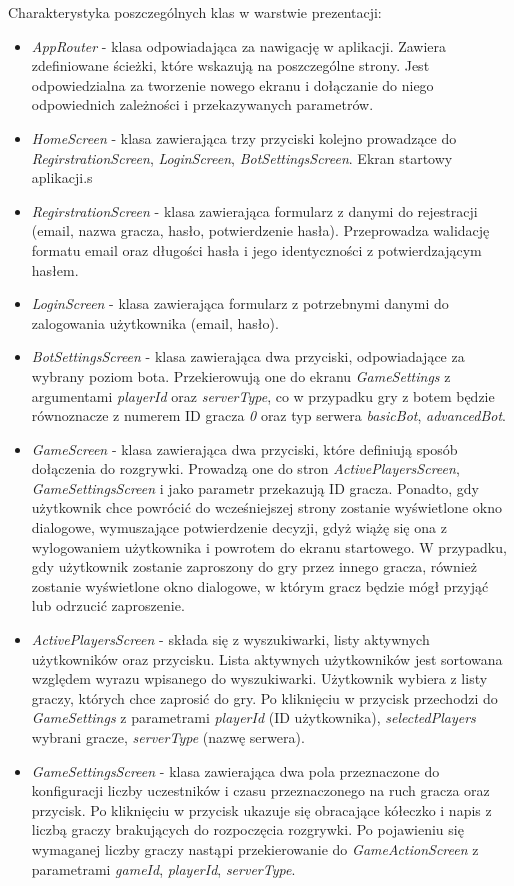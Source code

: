 Charakterystyka poszczególnych klas w warstwie prezentacji:
\begin{itemize}
	\item \emph{AppRouter} - klasa odpowiadająca za nawigację w aplikacji. Zawiera zdefiniowane ścieżki, które wskazują na poszczególne strony. Jest odpowiedzialna za tworzenie nowego ekranu i dołączanie do niego odpowiednich zależności i przekazywanych parametrów.
	\item \emph{HomeScreen} - klasa zawierająca trzy przyciski kolejno prowadzące do \emph{RegirstrationScreen}, \emph{LoginScreen}, \emph{BotSettingsScreen}. Ekran startowy aplikacji.s
	\item \emph{RegirstrationScreen} - klasa zawierająca formularz z danymi do rejestracji (email, nazwa gracza, hasło, potwierdzenie hasła). Przeprowadza walidację formatu email oraz długości hasła i jego identyczności z potwierdzającym hasłem.
	\item \emph{LoginScreen} - klasa zawierająca formularz z potrzebnymi danymi do zalogowania użytkownika (email, hasło).
	\item \emph{BotSettingsScreen} - klasa zawierająca dwa przyciski, odpowiadające za wybrany poziom bota. Przekierowują one do ekranu \emph{GameSettings} z argumentami \emph{playerId} oraz \emph{serverType}, co w przypadku gry z botem będzie równoznacze z numerem ID gracza \emph{0} oraz typ serwera \emph{basicBot}, \emph{advancedBot}.
	\item \emph{GameScreen} - klasa zawierająca dwa przyciski, które definiują sposób dołączenia do rozgrywki. Prowadzą one do stron \emph{ActivePlayersScreen}, \emph{GameSettingsScreen} i jako parametr przekazują ID gracza. Ponadto, gdy użytkownik chce powrócić do wcześniejszej strony zostanie wyświetlone okno dialogowe, wymuszające potwierdzenie decyzji, gdyż wiążę się ona z wylogowaniem użytkownika i powrotem do ekranu startowego. W przypadku, gdy użytkownik zostanie zaproszony do gry przez innego gracza, również zostanie wyświetlone okno dialogowe, w którym gracz będzie mógł przyjąć lub odrzucić zaproszenie.
	\item \emph{ActivePlayersScreen} - składa się z wyszukiwarki, listy aktywnych użytkowników oraz przycisku. Lista aktywnych użytkowników jest sortowana względem wyrazu wpisanego do wyszukiwarki. Użytkownik wybiera z listy graczy, których chce zaprosić do gry. Po kliknięciu w przycisk przechodzi do \emph{GameSettings} z parametrami \emph{playerId} (ID użytkownika), \emph{selectedPlayers} wybrani gracze, \emph{serverType} (nazwę serwera).
	\item \emph{GameSettingsScreen} - klasa zawierająca dwa pola przeznaczone do konfiguracji liczby uczestników i czasu przeznaczonego na ruch gracza oraz przycisk. Po kliknięciu w przycisk ukazuje się obracające kółeczko i napis z liczbą graczy brakujących do rozpoczęcia rozgrywki. Po pojawieniu się wymaganej liczby graczy nastąpi przekierowanie do \emph{GameActionScreen} z parametrami \emph{gameId}, \emph{playerId}, \emph{serverType}.

\end{itemize}

